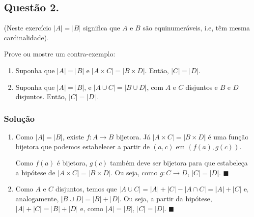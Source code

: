 \documentclass[12pt, letterpaper]{report}
\newcommand*{\CQD}{\hfill\ensuremath{\blacksquare}}%
\newcounter{ProblemNum}
\newcommand*{\anyproblem}[1]{\newpage\subsection*{#1}}
\newcommand*{\problem}[1]{\stepcounter{ProblemNum} %
   \anyproblem{Questão #1}}
\newcommand*{\soln}[1]{\subsubsection*{#1}}
\newcommand*{\solution}{\soln{Solução}}
\begin{document}
\problem{2.}
(Neste exercício $ |A| = |B| $ significa que $ A $ e $ B $ são equinumeráveis, i.e, têm mesma cardinalidade).

Prove ou mostre um contra-exemplo:

  \begin{enumerate}[label=\arabic*.]
    \item Suponha que $ |A| = |B| $ e $ |A \times C| = |B \times D| $. Então, $ |C| = |D| $.
    \item Suponha que $ |A| = |B| $, e $ |A \cup C| = |B \cup D| $, com $ A $ e $ C $ disjuntos e $ B $ e $ D $ disjuntos. Então, $ |C| = |D| $.
  \end{enumerate}

\solution
  \begin{enumerate}[label=\arabic*.]
    \item Como $ |A| = |B| $, existe $f: A \rightarrow B$ bijetora. Já $|A \times C| = |B \times D|$ é uma função bijetora que podemos estabelecer a partir de $(a, c)$ em $(f(a), g(c))$.

    Como $f(a)$ é bijetora, $g(c)$ também deve ser bijetora para que estabeleça a hipótese de $|A \times C| = |B \times D|$. Ou seja, como $g: C \rightarrow D$, $|C| = |D|$. \CQD

    \item Como $ A $ e $ C $ disjuntos, temos que $|A \cup C| = |A| + |C| - |A \cap C| = |A| + |C|$ e, analogamente, $ |B \cup D| = |B| + |D| $. Ou seja, a partir da hipótese, $|A| + |C| = |B| + |D|$ e, como $|A| = |B|$, $|C| = |D|$. \CQD
  \end{enumerate}
\end{document}
